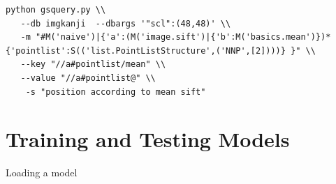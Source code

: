 \documentclass{report}
\begin{document}
\begin{lstlisting}
python gsquery.py \\
   --db imgkanji  --dbargs '"scl":(48,48)' \\
   -m "#M('naive')|{'a':(M('image.sift')|{'b':M('basics.mean')})*{'pointlist':S(('list.PointListStructure',('NNP',[2])))} }" \\
   --key "//a#pointlist/mean" \\
   --value "//a#pointlist@" \\
    -s "position according to mean sift"

\end{lstlisting}

















\section{Training and Testing Models}
Loading a model
\end{document}
